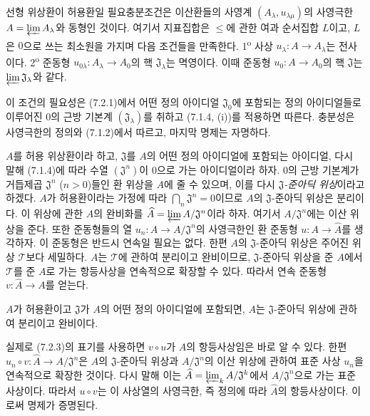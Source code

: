 \begin{lemma}[7.2.2]
\label{0.7.2.2-ko}
선형 위상환이 허용환일 필요충분조건은 이산환들의 사영계
$(A_\lambda,u_{\lambda\mu})$의 사영극한
$A=\varprojlim A_\lambda$와 동형인 것이다. 여기서 지표집합은
$\leq$에 관한 여과 순서집합 $L$이고, $L$은 $0$으로 쓰는 최소원을
가지며 다음 조건들을 만족한다.
1\textsuperscript{o} 사상 $u_\lambda:A\to A_\lambda$는 전사이다.
2\textsuperscript{o} 준동형
$u_{0\lambda}:A_\lambda\to A_0$의 핵 $\mathfrak J_\lambda$는
멱영이다. 이때 준동형 $u_0:A\to A_0$의 핵 $\mathfrak J$는
$\varprojlim\mathfrak J_\lambda$와 같다.
\end{lemma}

이 조건의 필요성은 (7.2.1)에서 어떤 정의 아이디얼
$\mathfrak J_0$에 포함되는 정의 아이디얼들로 이루어진 $0$의 근방
기본계 $(\mathfrak J_\lambda)$를 취하고 (7.1.4, (i))를 적용하면
따른다. 충분성은 사영극한의 정의와 (7.1.2)에서 따르고, 마지막
명제는 자명하다.

\begin{env}[7.2.3]
\label{0.7.2.3-ko}
$A$를 허용 위상환이라 하고, $\mathfrak J$를 $A$의 어떤 정의
아이디얼에 포함되는 아이디얼, 다시 말해 (7.1.4)에 따라 수열
$(\mathfrak J^n)$이 $0$으로 가는 아이디얼이라 하자. $0$의 근방
기본계가 거듭제곱 $\mathfrak J^n$ ($n>0$)들인 환 위상을 $A$에
줄 수 있으며, 이를 다시 \emph{$\mathfrak J$-준아딕 위상}이라고
하겠다. $A$가 허용환이라는 가정에 따라
$\bigcap_n\mathfrak J^n=0$이므로 $A$의 $\mathfrak J$-준아딕
위상은 분리이다. 이 위상에 관한 $A$의 완비화를
$\widehat A=\varprojlim A/\mathfrak J^n$이라 하자. 여기서
$A/\mathfrak J^n$에는 이산 위상을 준다. 또한 준동형들의 열
$u_n:A\to A/\mathfrak J^n$의 사영극한인 환 준동형
$u:A\to\widehat A$를 생각하자. 이 준동형은 반드시 연속일 필요는
없다. 한편 $A$의 $\mathfrak J$-준아딕 위상은 주어진 위상
$\mathcal T$보다 세밀하다. $A$는 $\mathcal T$에 관하여 분리이고
완비이므로, $\mathfrak J$-준아딕 위상을 준 $A$에서
$\mathcal T$를 준 $A$로 가는 항등사상을 연속적으로 확장할 수 있다.
따라서 연속 준동형 $v:\widehat A\to A$를 얻는다.
\end{env}

\begin{proposition}[7.2.4]
\label{0.7.2.4-ko}
$A$가 허용환이고 $\mathfrak J$가 $A$의 어떤 정의 아이디얼에
포함되면, $A$는 $\mathfrak J$-준아딕 위상에 관하여 분리이고
완비이다.
\end{proposition}

실제로 (7.2.3)의 표기를 사용하면 $v\circ u$가 $A$의 항등사상임은
바로 알 수 있다. 한편
$u_n\circ v:\widehat A\to A/\mathfrak J^n$은
$A$의 $\mathfrak J$-준아딕 위상과 $A/\mathfrak J^n$의 이산
위상에 관하여 표준 사상 $u_n$을 연속적으로 확장한 것이다. 다시
말해 이는
$\widehat A=\varprojlim_k A/\mathfrak J^k$에서
$A/\mathfrak J^n$으로 가는 표준 사상이다. 따라서 $u\circ v$는 이
사상열의 사영극한, 즉 정의에 따라 $\widehat A$의 항등사상이다.
이로써 명제가 증명된다.

